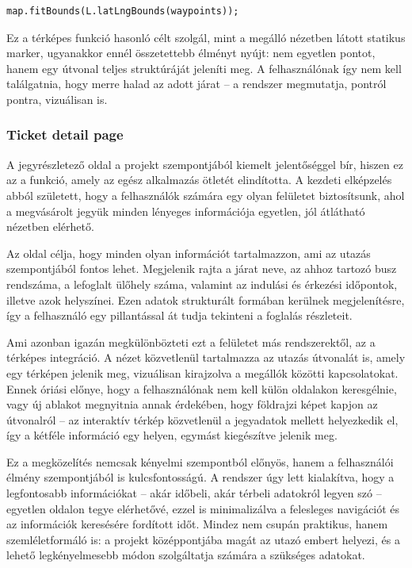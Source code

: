\begin{lstlisting}
map.fitBounds(L.latLngBounds(waypoints));
\end{lstlisting}

Ez a térképes funkció hasonló célt szolgál, mint a megálló nézetben látott statikus marker, ugyanakkor ennél összetettebb élményt nyújt: nem egyetlen pontot, hanem egy útvonal teljes struktúráját jeleníti meg. A felhasználónak így nem kell találgatnia, hogy merre halad az adott járat – a rendszer megmutatja, pontról pontra, vizuálisan is.


\subsubsection{Ticket detail page }

A jegyrészletező oldal a projekt szempontjából kiemelt jelentőséggel bír, hiszen ez az a funkció, amely az egész alkalmazás ötletét elindította. A kezdeti elképzelés abból született, hogy a felhasználók számára egy olyan felületet biztosítsunk, ahol a megvásárolt jegyük minden lényeges információja egyetlen, jól átlátható nézetben elérhető.

Az oldal célja, hogy minden olyan információt tartalmazzon, ami az utazás szempontjából fontos lehet. Megjelenik rajta a járat neve, az ahhoz tartozó busz rendszáma, a lefoglalt ülőhely száma, valamint az indulási és érkezési időpontok, illetve azok helyszínei. Ezen adatok strukturált formában kerülnek megjelenítésre, így a felhasználó egy pillantással át tudja tekinteni a foglalás részleteit.

Ami azonban igazán megkülönbözteti ezt a felületet más rendszerektől, az a térképes integráció. A nézet közvetlenül tartalmazza az utazás útvonalát is, amely egy térképen jelenik meg, vizuálisan kirajzolva a megállók közötti kapcsolatokat. Ennek óriási előnye, hogy a felhasználónak nem kell külön oldalakon keresgélnie, vagy új ablakot megnyitnia annak érdekében, hogy földrajzi képet kapjon az útvonalról – az interaktív térkép közvetlenül a jegyadatok mellett helyezkedik el, így a kétféle információ egy helyen, egymást kiegészítve jelenik meg.

Ez a megközelítés nemcsak kényelmi szempontból előnyös, hanem a felhasználói élmény szempontjából is kulcsfontosságú. A rendszer úgy lett kialakítva, hogy a legfontosabb információkat – akár időbeli, akár térbeli adatokról legyen szó – egyetlen oldalon tegye elérhetővé, ezzel is minimalizálva a felesleges navigációt és az információk keresésére fordított időt. Mindez nem csupán praktikus, hanem szemléletformáló is: a projekt középpontjába magát az utazó embert helyezi, és a lehető legkényelmesebb módon szolgáltatja számára a szükséges adatokat.

